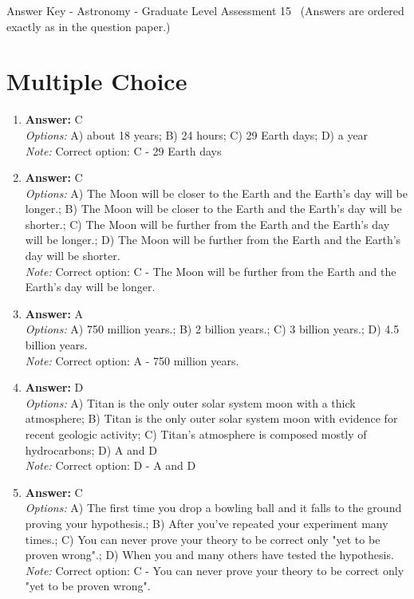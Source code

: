 \documentclass[12pt]{article}
\begin{document}
\begin{center}
Answer Key - Astronomy - Graduate Level Assessment 15 \
\small (Answers are ordered exactly as in the question paper.)
\end{center}

\section*{Multiple Choice}
\begin{enumerate}[label=\arabic*.]
\item \textbf{Answer:} C
\\ \textit{Options:} A) about 18 years; B) 24 hours; C) 29 Earth days; D) a year
\\ \textit{Note:} Correct option: C - 29 Earth days
\item \textbf{Answer:} C
\\ \textit{Options:} A) The Moon will be closer to the Earth and the Earth's day will be longer.; B) The Moon will be closer to the Earth and the Earth's day will be shorter.; C) The Moon will be further from the Earth and the Earth's day will be longer.; D) The Moon will be further from the Earth and the Earth's day will be shorter.
\\ \textit{Note:} Correct option: C - The Moon will be further from the Earth and the Earth's day will be longer.
\item \textbf{Answer:} A
\\ \textit{Options:} A) 750 million years.; B) 2 billion years.; C) 3 billion years.; D) 4.5 billion years.
\\ \textit{Note:} Correct option: A - 750 million years.
\item \textbf{Answer:} D
\\ \textit{Options:} A) Titan is the only outer solar system moon with a thick atmosphere; B) Titan is the only outer solar system moon with evidence for recent geologic activity; C) Titan's atmosphere is composed mostly of hydrocarbons; D) A and D
\\ \textit{Note:} Correct option: D - A and D
\item \textbf{Answer:} C
\\ \textit{Options:} A) The first time you drop a bowling ball and it falls to the ground proving your hypothesis.; B) After you've repeated your experiment many times.; C) You can never prove your theory to be correct only "yet to be proven wrong".; D) When you and many others have tested the hypothesis.
\\ \textit{Note:} Correct option: C - You can never prove your theory to be correct only "yet to be proven wrong".
\end{enumerate}
\end{document}
